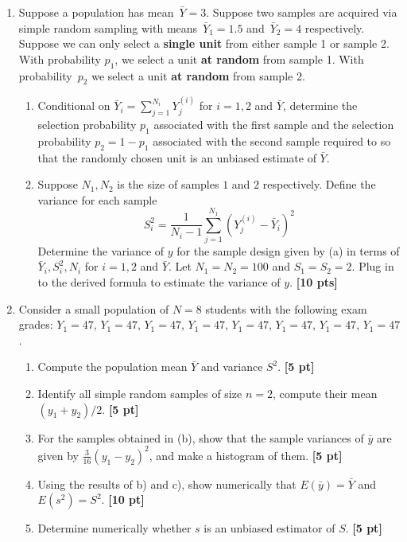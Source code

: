\documentclass[12pt]{article}
\def\given{\, | \,}
\begin{document}
\begin{enumerate}
\begin{enumerate}
		\item Show numerically using the above example that $E (X) = E(E(X \given C) )$ and $V(X) = V(E(X \given C)) + E(V(X \given C))$ {\bf [10 pt]}

		\end{enumerate}

\item Suppose a population has mean~$\bar Y = 3$. Suppose two samples are acquired via simple random sampling with means~$\bar Y_1 = 1.5$ and~$\bar Y_2 = 4$ respectively.  Suppose we can only select a {\bf single unit} from either sample 1 or sample 2.  With probability $p_1$, we select a unit {\bf at random} from sample 1.  With probability~$p_2$ we select a unit {\bf at random} from sample 2.

	\begin{enumerate}
		\item Conditional on $\bar Y_i = \sum_{j=1}^{N_i} Y_j^{(i)}$ for $i=1,2$ and $\bar Y$, determine the selection probability $p_1$ associated with the first sample and the selection probability $p_2 = 1-p_1$ associated with the second sample required to so that the randomly chosen unit is an unbiased estimate of $\bar Y$.
		\item Suppose $N_1, N_2$ is the size of samples $1$ and $2$ respectively.  Define the variance for each sample
			$$S_i^2= \frac{1}{N_i-1} \sum_{j=1}^{N_1} (Y_j^{(i)} - \bar Y_i)^2 $$
		Determine the variance of $y$ for the sample design given by (a) in terms of $\bar Y_i, S_i^2, N_i$ for $i=1,2$ and $\bar Y$. Let $N_1 = N_2 = 100$ and $S_1 = S_2 = 2$.  Plug in to the derived formula to estimate the variance of $y$. {\bf [10 pts]}
	\end{enumerate}

\item Consider a small population of $N = 8$ students with the following exam grades: $Y_1 = 47$, $Y_1 = 47$, $Y_1 = 47$, $Y_1 = 47$, $Y_1 = 47$, $Y_1 = 47$, $Y_1 = 47$, $Y_1 = 47$.

	\begin{enumerate}
		\setlength{\itemsep}{15pt}%
		\setlength{\parskip}{15pt}%

		\item Compute the population mean $\bar Y$ and variance $S^2$. {\bf [5 pt]}
		\item Identify all simple random samples of size $n=2$, compute their mean $(y_1 + y_2)/2$. {\bf [5 pt]}
		\item For the samples obtained in (b), show that the sample variances of $\bar y$ are given by $\frac{3}{16} (y_1 - y_2)^2$, and make a histogram of them. {\bf [5 pt]}
		\item Using the results of b) and c), show numerically that $E(\bar y) = \bar Y$ and $E (s^2) = S^2$. {\bf [10 pt]}
		\item Determine numerically whether $s$ is an unbiased estimator of $S$. {\bf [5 pt]}
	\end{enumerate}


\end{enumerate}
\end{document}
